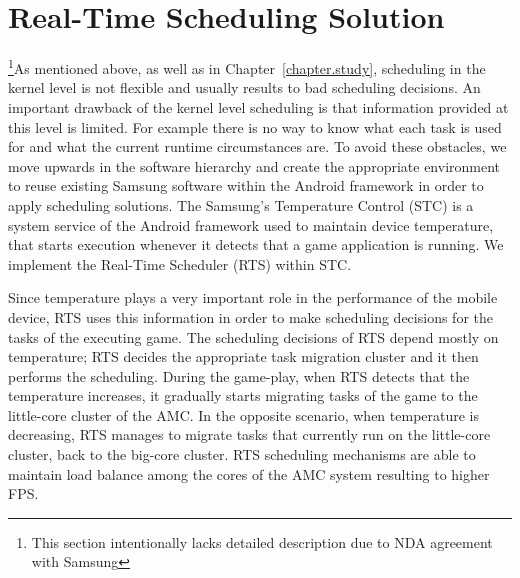 \section{Real-Time Scheduling Solution}

\footnote{This section intentionally lacks detailed description due to NDA agreement with Samsung}As mentioned above, as well as in Chapter~\ref{chapter.study}, scheduling in the kernel level is not flexible and usually results to bad scheduling decisions.
An important drawback of the kernel level scheduling is that information provided at this level is limited. 
For example there is no way to know what each task is used for and what the current runtime circumstances are. 
To avoid these obstacles, we move upwards in the software hierarchy and create the appropriate environment to reuse existing Samsung software within the Android framework in order to apply scheduling solutions. 
The Samsung’s Temperature Control (STC) is a system service of the Android framework used to maintain device temperature, that starts execution whenever it detects that a game application is running.
We implement the Real-Time Scheduler (RTS) within STC.

Since temperature plays a very important role in the performance of the mobile device, RTS uses this information in order to make scheduling decisions for the tasks of the executing game.
The scheduling decisions of RTS depend mostly on temperature; RTS decides the appropriate task migration cluster and it then performs the scheduling.
During the game-play, when RTS detects that the temperature increases, it gradually starts migrating tasks of the game to the little-core cluster of the AMC.
In the opposite scenario, when temperature is decreasing, RTS manages to migrate tasks that currently run on the little-core cluster, back to the big-core cluster.
RTS scheduling mechanisms are able to maintain load balance among the cores of the AMC system resulting to higher FPS.


